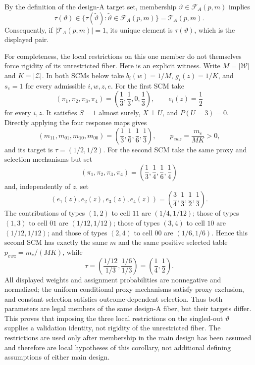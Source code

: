 By the definition of the design-A target set, membership \(\vartheta\in\mathcal F_A(p,m)\) implies
\[
 \tau(\vartheta)\in
 \{\tau(\widetilde\vartheta):\widetilde\vartheta\in\mathcal F_A(p,m)\}
 =\mathcal T_A(p,m).
\]
Consequently, if \(\lvert\mathcal T_A(p,m)\rvert=1\), its unique element is \(\tau(\vartheta)\), which is the displayed pair.

For completeness, the local restrictions on this one member do not themselves force rigidity of its unrestricted fiber.  Here is an explicit witness.  Write \(M=\lvert\mathcal W\rvert\) and \(K=\lvert\mathcal Z\rvert\).  In both SCMs below take \(b_i(w)=1/M\), \(g_i(z)=1/K\), and \(s_e=1\) for every admissible \(i,w,z,e\).  For the first SCM take
\[
 (\pi_1,\pi_2,\pi_3,\pi_4)=\left(\frac13,\frac13,0,\frac13\right),
 \qquad e_i(z)=\frac12
\]
for every \(i,z\).  It satisfies \(S=1\) almost surely, \(X\perp U\), and \(P(U=3)=0\).  Directly applying the four response maps gives
\[
 (m_{11},m_{01},m_{10},m_{00})
 =\left(\frac13,\frac16,\frac16,\frac13\right),
 \qquad
 p_{ewz}=\frac{m_e}{MK}>0,
\]
and its target is \(\tau=(1/2,1/2)\).  For the second SCM take the same proxy and selection mechanisms but set
\[
 (\pi_1,\pi_2,\pi_3,\pi_4)
 =\left(\frac13,\frac14,\frac16,\frac14\right)
\]
and, independently of \(z\), set
\[
 (e_1(z),e_2(z),e_3(z),e_4(z))
 =\left(\frac34,\frac13,\frac12,\frac13\right).
\]
The contributions of types \((1,2)\) to cell \(11\) are \((1/4,1/12)\); those of types \((1,3)\) to cell \(01\) are \((1/12,1/12)\); those of types \((3,4)\) to cell \(10\) are \((1/12,1/12)\); and those of types \((2,4)\) to cell \(00\) are \((1/6,1/6)\).  Hence this second SCM has exactly the same \(m\) and the same positive selected table \(p_{ewz}=m_e/(MK)\), while
\[
 \tau=\left(\frac{1/12}{1/3},\frac{1/6}{1/3}\right)
 =\left(\frac14,\frac12\right).
\]
All displayed weights and assignment probabilities are nonnegative and normalized; the uniform conditional proxy mechanisms satisfy proxy exclusion, and constant selection satisfies outcome-dependent selection.  Thus both parameters are legal members of the same design-A fiber, but their targets differ.  This proves that imposing the three local restrictions on the singled-out \(\vartheta\) supplies a validation identity, not rigidity of the unrestricted fiber.  The restrictions are used only after membership in the main design has been assumed and therefore are local hypotheses of this corollary, not additional defining assumptions of either main design.
